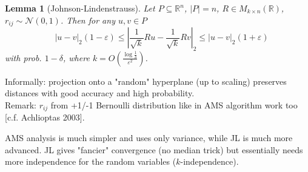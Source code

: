 \documentclass[11pt]{article}
\newtheorem{lemma}[theorem]{Lemma}
\begin{document}
\begin{lemma}[Johnson-Lindenstrauss]
Let $P \subseteq \mathbb{R}^n$, $|P| = n$, $R \in M_{k \times n}(\mathbb{R})$, $r_{ij} \sim \mathcal{N}(0, 1)$. Then for any $u,v \in P$
$$\quad |u-v|_2 (1 - \varepsilon) \leq \left| \frac{1}{\sqrt{k}}Ru - \frac{1}{\sqrt{k}} Rv \right|_2 \leq |u-v|_2 (1+\varepsilon)$$
with prob. $1-\delta$, where $k = O \left( \frac{\log{\frac{1}{\delta}}}{\varepsilon^2}\right)$.
\end{lemma}

Informally: projection onto a "random" hyperplane (up to scaling) preserves distances with good accuracy and high probability. \\
Remark: $r_{ij}$ from +1/-1 Bernoulli distribution like in AMS algorithm work too [c.f. Achlioptas 2003].

AMS analysis is much simpler and uses only variance, while JL is much more advanced. JL gives "fancier" convergence (no median trick) but essentially needs more independence for the random variables ($k$-independence).
\end{document}
